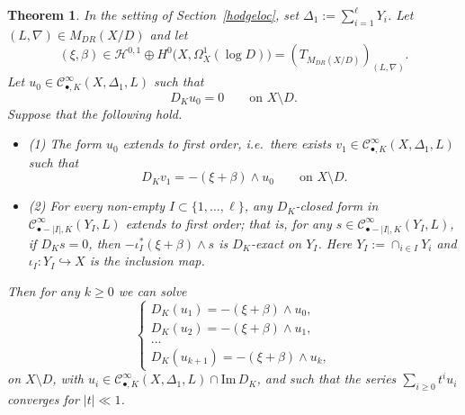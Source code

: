 \documentclass[english]{amsart}
\newcommand{\cC}{\mathcal{C}}
\newcommand{\im}{\mathrm{Im} \,}
\renewcommand{\ge}{\geqslant}
\newtheorem{thm}{Theorem}[section]
\numberwithin{equation}{thm}
\begin{document}
\begin{thm}\label{solveequs}
	In the setting of Section~\ref{hodgeloc}, set $\Delta_1 := \sum_{i=1}^{\ell} Y_i$.
	Let $(L,\nabla) \in M_{DR}(X/D)$ and let
	\[
	(\xi,\beta)\in \mathcal{H}^{0,1} \oplus H^0\bigl(X,\Omega_X^1(\log D)\bigr)
	= (T_{M_{DR}(X/D)})_{(L,\nabla)}.
	\]
	Let $u_0 \in \cC^\infty_{\bullet,K}(X,\Delta_1,L)$ such that
	\[
	D_K u_0 = 0 \qquad \text{on } X\setminus D.
	\]
	Suppose that the following hold.
	\begin{itemize}
		\item (1) The form $u_0$ extends to first order, i.e.\ there exists $v_1\in \cC^\infty_{\bullet,K}(X,\Delta_1,L)$ such that
		\[
		D_K v_1 = -(\xi+\beta)\wedge u_0 \qquad \text{on } X\setminus D.
		\]
		\item (2) For every non-empty $I\subset \{1,\ldots,\ell\}$, any $D_K$-closed form in $\cC^\infty_{\bullet-|I|,K}(Y_I,L)$ extends to first order; that is, for any $s\in \cC^\infty_{\bullet-|I|,K}(Y_I,L)$, if $D_K s = 0$, then $-\iota_I^*(\xi+\beta)\wedge s$ is $D_K$-exact on $Y_I$.
		Here $Y_I := \cap_{i\in I} Y_i$ and $\iota_I:Y_I\hookrightarrow X$ is the inclusion map.
	\end{itemize}
	Then for any $k\ge 0$ we can solve
	\begin{equation}\label{simp4611}
		\begin{cases}
			D_K(u_1)= -(\xi+\beta)\wedge u_0,\\
			D_K(u_2)= -(\xi+\beta)\wedge u_1,\\
			\ldots\\
			D_K(u_{k+1})= -(\xi+\beta)\wedge u_k,
		\end{cases}
	\end{equation}
	on $X\setminus D$, with $u_i \in \cC^\infty_{\bullet,K}(X,\Delta_1,L)\cap \im D_K$, and such that the series $\sum_{i\ge 0} t^i u_i$ converges for $|t|\ll 1$.
\end{thm}
\end{document}
